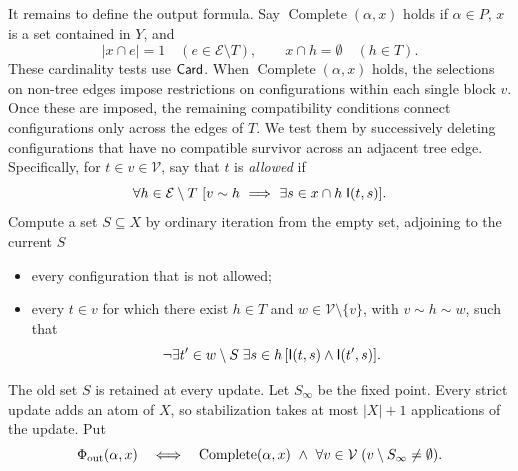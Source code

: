 It remains to define the output formula. Say
\(\operatorname{Complete}(\alpha,x)\) holds if \(\alpha\in P\), \(x\)
is a set contained in \(Y\), and
\[
 |x\cap e|=1\quad(e\in\mathcal E\setminus T),\qquad
 x\cap h=\emptyset\quad(h\in T).
\]
These cardinality tests use \(\mathsf{Card}\). When
\(\operatorname{Complete}(\alpha,x)\) holds, the selections on non-tree
edges impose restrictions on configurations within each single block
\(v\). Once these are imposed, the remaining compatibility
conditions connect configurations only across the edges of \(T\).
We test them by successively deleting configurations that have no
compatible survivor across an adjacent tree edge.
Specifically, for \(t\in v\in\mathcal V\), say that \(t\) is
\emph{allowed} if
\begin{equation}
 \forall h\in\mathcal E\setminus T\
 [v\sim h\ \Longrightarrow\
           \exists s\in x\cap h\;\mathsf I(t,s)].
 \label{sen:allowed}
\end{equation}
Compute a set \(S\subseteq X\) by ordinary iteration from the empty set,
adjoining to the current \(S\)
\begin{itemize}
 \item every configuration that is not allowed;
 \item every \(t\in v\) for which there exist
       \(h\in T\) and \(w\in\mathcal V\setminus\{v\}\), with
       \(v\sim h\sim w\), such that
       \[
        \neg\exists t'\in w\setminus S\;\exists s\in h\,
                      [\mathsf I(t,s)\land\mathsf I(t',s)].
       \]
\end{itemize}
The old set \(S\) is retained at every update. Let \(S_\infty\) be the
fixed point. Every strict update adds an atom of \(X\), so stabilization
takes at most \(|X|+1\) applications of the update. Put
\begin{equation}
 \Phi_{\rm out}(\alpha,x)
 \quad\Longleftrightarrow\quad
 \operatorname{Complete}(\alpha,x)\ \land\
       \forall v\in\mathcal V\;(v\setminus S_\infty\ne\emptyset).
 \label{sen:output}
\end{equation}

